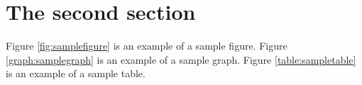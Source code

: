 \section{The second section}
Figure \ref{fig:samplefigure} is an example of a sample figure.
Figure \ref{graph:samplegraph} is an example of a sample graph.
Figure \ref{table:sampletable} is an example of a sample table.


